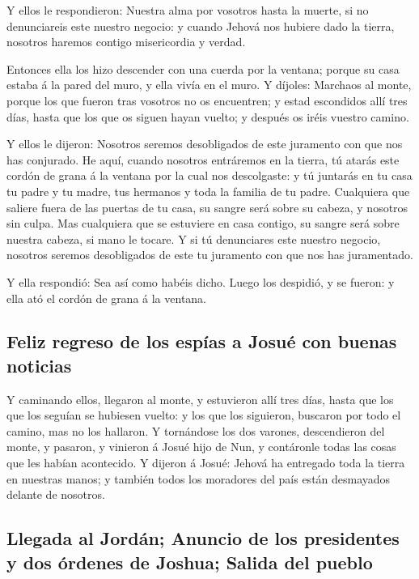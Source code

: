  Y ellos le respondieron: Nuestra alma por vosotros hasta
la muerte, si no denunciareis este nuestro negocio: y cuando Jehová nos
hubiere dado la tierra, nosotros haremos contigo misericordia y verdad.

 Entonces ella los hizo descender con una cuerda por la
ventana; porque su casa estaba á la pared del muro, y ella vivía en el
muro.  Y díjoles: Marchaos al monte, porque los que fueron
tras vosotros no os encuentren; y estad escondidos allí tres días, hasta
que los que os siguen hayan vuelto; y después os iréis vuestro camino.

 Y ellos le dijeron: Nosotros seremos desobligados de este
juramento con que nos has conjurado.  He aquí, cuando
nosotros entráremos en la tierra, tú atarás este cordón de grana á la
ventana por la cual nos descolgaste: y tú juntarás en tu casa tu padre y
tu madre, tus hermanos y toda la familia de tu padre. 
Cualquiera que saliere fuera de las puertas de tu casa, su sangre será
sobre su cabeza, y nosotros sin culpa. Mas cualquiera que se estuviere
en casa contigo, su sangre será sobre nuestra cabeza, si mano le tocare.
 Y si tú denunciares este nuestro negocio, nosotros seremos
desobligados de este tu juramento con que nos has juramentado.

 Y ella respondió: Sea así como habéis dicho. Luego los
despidió, y se fueron: y ella ató el cordón de grana á la ventana.

\hypertarget{feliz-regreso-de-los-espuxedas-a-josuuxe9-con-buenas-noticias}{%
\subsection{Feliz regreso de los espías a Josué con buenas
noticias}\label{feliz-regreso-de-los-espuxedas-a-josuuxe9-con-buenas-noticias}}

 Y caminando ellos, llegaron al monte, y estuvieron allí
tres días, hasta que los que los seguían se hubiesen vuelto: y los que
los siguieron, buscaron por todo el camino, mas no los hallaron.
 Y tornándose los dos varones, descendieron del monte, y
pasaron, y vinieron á Josué hijo de Nun, y contáronle todas las cosas
que les habían acontecido.  Y dijeron á Josué: Jehová ha
entregado toda la tierra en nuestras manos; y también todos los
moradores del país están desmayados delante de nosotros.

\hypertarget{llegada-al-jorduxe1n-anuncio-de-los-presidentes-y-dos-uxf3rdenes-de-joshua-salida-del-pueblo}{%
\subsection{Llegada al Jordán; Anuncio de los presidentes y dos órdenes
de Joshua; Salida del
pueblo}\label{llegada-al-jorduxe1n-anuncio-de-los-presidentes-y-dos-uxf3rdenes-de-joshua-salida-del-pueblo}}


